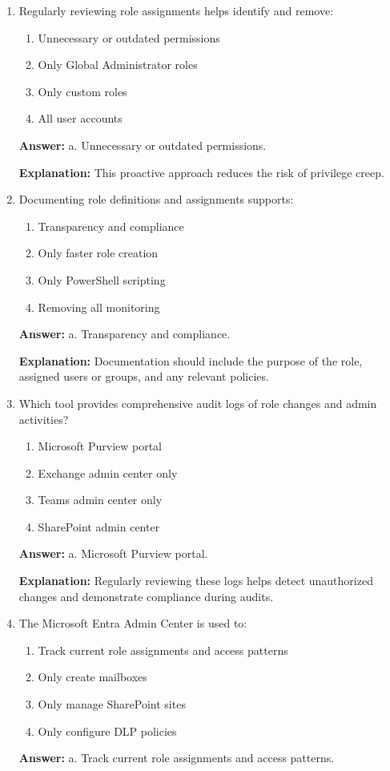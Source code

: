 \documentclass[10pt]{article}
\begin{document}
\begin{enumerate}[leftmargin=*]
\textbf{Explanation:} When a user joins or leaves a group, their role assignments are automatically updated.

\item Regularly reviewing role assignments helps identify and remove:
\begin{enumerate}[label=\alph*., leftmargin=1.5em]
\item Unnecessary or outdated permissions
\item Only Global Administrator roles
\item Only custom roles
\item All user accounts
\end{enumerate}
\textbf{Answer:} a. Unnecessary or outdated permissions.

\textbf{Explanation:} This proactive approach reduces the risk of privilege creep.

\item Documenting role definitions and assignments supports:
\begin{enumerate}[label=\alph*., leftmargin=1.5em]
\item Transparency and compliance
\item Only faster role creation
\item Only PowerShell scripting
\item Removing all monitoring
\end{enumerate}
\textbf{Answer:} a. Transparency and compliance.

\textbf{Explanation:} Documentation should include the purpose of the role, assigned users or groups, and any relevant policies.

\item Which tool provides comprehensive audit logs of role changes and admin activities?
\begin{enumerate}[label=\alph*., leftmargin=1.5em]
\item Microsoft Purview portal
\item Exchange admin center only
\item Teams admin center only
\item SharePoint admin center
\end{enumerate}
\textbf{Answer:} a. Microsoft Purview portal.

\textbf{Explanation:} Regularly reviewing these logs helps detect unauthorized changes and demonstrate compliance during audits.

\item The Microsoft Entra Admin Center is used to:
\begin{enumerate}[label=\alph*., leftmargin=1.5em]
\item Track current role assignments and access patterns
\item Only create mailboxes
\item Only manage SharePoint sites
\item Only configure DLP policies
\end{enumerate}
\textbf{Answer:} a. Track current role assignments and access patterns.


\end{enumerate}
\end{document}
